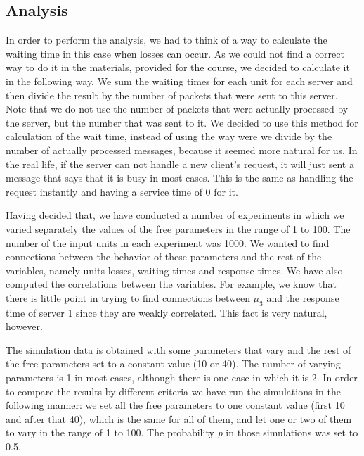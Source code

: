 \documentclass[12pt]{article}
\theoremstyle{plain}
\begin{document}
\subsection*{Analysis}
In order to perform the analysis, we had to think of a way to calculate the
waiting time in this case when losses can occur. As we could not find a correct
way to do it in the materials, provided for the course, we decided to calculate
it in the following way. We sum the waiting times for each unit for each server
and then divide the result by the number of packets that were sent to this 
server. Note that we do not use the number of packets that were actually
processed by the server, but the number that was sent to it. We decided to use
this method for calculation of the wait time, instead of using the way were we
divide by the number of actually processed messages, because it seemed more 
natural for us. In the real life, if the server can not handle a new client's
request, it will just sent a message that says that it is busy in most cases.
This is the same as handling the request instantly and having a service time of
0 for it.

Having decided that, we have conducted a number of experiments in which we
varied separately the values of the free parameters in the range of 1 to 100.
The number of the input units in each experiment was 1000. We wanted to find
connections between the behavior of these parameters and the rest of the
variables, namely units losses, waiting times and response times. We have also
computed the correlations between the variables. For example, we know that
there is little point in trying to find connections between $\mu_3$ and the
response time of server 1 since they are weakly correlated. This fact is very
natural, however. 

The simulation data is obtained with some parameters that vary and the rest of
the free parameters set to a constant value (10 or 40). The number of varying 
parameters is 1 in most cases, although there is one case in which it is 2. 
In order to compare the results by different criteria we have run the
simulations in the following manner: we set all the free parameters to one
constant value (first 10 and after that 40), which is the same for all of them,
and let one or two of them to vary in the range of 1 to 100. The probability
\emph{p} in those simulations was set to 0.5.  
\end{document}
